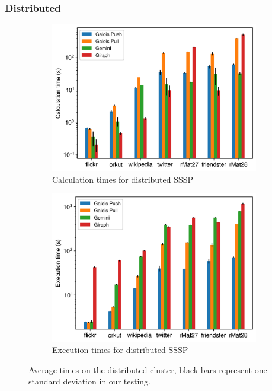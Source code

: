 \subsubsection{Distributed}
\begin{figure}
	\begin{subfigure}{\columnwidth}
		\includegraphics[width=\linewidth]{../../plots/distributedSSSP_calcTime.png}
		\caption{Calculation times for distributed SSSP}
		\label{fig:distributedSSSP_calc}
	\end{subfigure}
	\hfil
	\begin{subfigure}{\columnwidth}
		\includegraphics[width=\linewidth]{../../plots/distributedSSSP_execTime.png}
		\caption{Execution times for distributed SSSP}
		\label{fig:distributedSSSP_exec}
	\end{subfigure}
	\caption{Average times on the distributed cluster, black bars represent one standard deviation in our testing.}
	\label{fig:distributedSSSP}
\end{figure}

